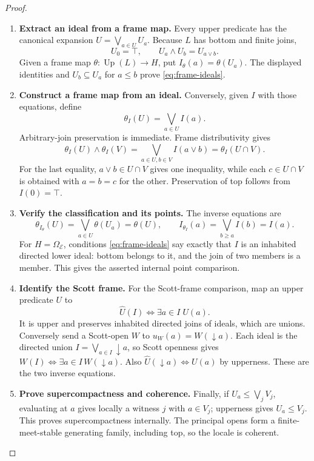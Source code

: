 \documentclass[11pt,a4paper]{article}
\numberwithin{algorithm}{section}
\numberwithin{equation}{section}
\theoremstyle{definition}
\theoremstyle{remark}
\theoremstyle{plain}
\newcommand{\E}{\mathcal E}
\newcommand{\Truth}{\Omega_{\E}}
\newcommand{\Up}{\operatorname{Up}}
\theoremstyle{definition}
\theoremstyle{plain}
\begin{document}
\begin{proof}\leavevmode
\begin{enumerate}[leftmargin=*,align=left]
\item \textbf{Extract an ideal from a frame map.}
Every upper predicate has the canonical expansion
$U=\bigvee_{a\in U}U_a$. Because $L$ has bottom and
finite joins,
\[
 U_0=\top,\qquad U_a\wedge U_b=U_{a\vee b}.
\]
Given a frame map $\theta:\Up(L)\to H$, put
$I_\theta(a)=\theta(U_a)$. The displayed identities and
$U_b\subseteq U_a$ for $a\le b$ prove
\eqref{eq:frame-ideals}.

\item \textbf{Construct a frame map from an ideal.}
Conversely, given $I$ with those equations, define
\[
 \theta_I(U)=\bigvee_{a\in U}I(a).
\]
Arbitrary-join preservation is immediate. Frame distributivity gives
\[
 \theta_I(U)\wedge\theta_I(V)
 =\bigvee_{a\in U,b\in V}I(a\vee b)
 =\theta_I(U\cap V).
\]
For the last equality, $a\vee b\in U\cap V$ gives one
inequality, while each $c\in U\cap V$ is obtained with $a=b=c$
for the other. Preservation of top follows from $I(0)=\top$.

\item \textbf{Verify the classification and its points.}
The inverse equations are
\[
 \theta_{I_\theta}(U)=\bigvee_{a\in U}\theta(U_a)=\theta(U),
 \qquad I_{\theta_I}(a)=\bigvee_{b\ge a}I(b)=I(a).
\]
For $H=\Truth$, conditions \eqref{eq:frame-ideals} say exactly
that $I$ is an inhabited directed lower ideal: bottom belongs
to it, and the join of two members is a member. This gives
the asserted internal point comparison.

\item \textbf{Identify the Scott frame.}
For the Scott-frame comparison, map an upper predicate $U$ to
\[
 \widehat U(I)\iff\exists a\in I\;U(a).
\]
It is upper and preserves inhabited directed joins of ideals,
which are unions. Conversely send a Scott-open $W$ to
$u_W(a)=W(\downarrow a)$. Each ideal is the directed union
$I=\bigvee_{a\in I}\downarrow a$, so Scott openness gives
$W(I)\iff\exists a\in I\,W(\downarrow a)$.
Also $\widehat U(\downarrow a)\iff U(a)$ by upperness.
These are the two inverse equations.

\item \textbf{Prove supercompactness and coherence.}
Finally, if
$U_a\le\bigvee_jV_j$, evaluating at $a$ gives locally a
witness $j$ with $a\in V_j$; upperness gives $U_a\le V_j$.
This proves supercompactness internally. The principal opens
form a finite-meet-stable generating family, including top,
so the locale is coherent.
\end{enumerate}
\end{proof}
\end{document}
